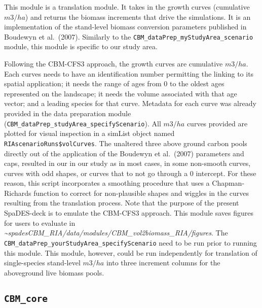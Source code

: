 \documentclass[
]{article}
\begin{document}
This module is a translation module. It takes in the growth curves
(cumulative \(m3/ha\)) and returns the biomass increments that drive the
simulations. It is an implementation of the stand-level biomass
conversion parameters published in Boudewyn et al.~(2007). Similarly to
the \texttt{CBM\_dataPrep\_myStudyArea\_scenario} module, this module is
specific to our study area.

Following the CBM-CFS3 approach, the growth curves are cumulative
\(m3/ha\). Each curves needs to have an identification number permitting
the linking to its spatial application; it needs the range of ages from
0 to the oldest ages represented on the landscape; it needs the volume
associated with that age vector; and a leading species for that curve.
Metadata for each curve was already provided in the data preparation
module (\texttt{CBM\_dataPrep\_studyArea\_specifyScenario}). All
\(m3/ha\) curves provided are plotted for visual inspection in a simList
object named \texttt{RIAscenarioRuns\$volCurves}. The unaltered three
above ground carbon pools directly out of the application of the
Boudewyn et al.~(2007) parameters and caps, resulted in our in our study
as in most cases, in some non-smooth curves, curves with odd shapes, or
curves that to not go through a 0 intercept. For these reason, this
script incorporates a smoothing procedure that uses a Chapman-Richards
function to correct for non-plausible shapes and wiggles in the curves
resulting from the translation process. Note that the purpose of the
present SpaDES-deck is to emulate the CBM-CFS3 approach. This module
saves figures for users to evaluate in
\emph{\textasciitilde spadesCBM\_RIA/data/modules/CBM\_vol2biomass\_RIA/figures}.
The \texttt{CBM\_dataPrep\_yourStudyArea\_specifyScenario} need to be
run prior to running this module. This module, however, could be run
independently for translation of single-species stand-level \(m3/ha\)
into three increment columns for the aboveground live biomass pools.

\hypertarget{cbm_core}{%
\subsection{\texorpdfstring{\texttt{CBM\_core}}{CBM\_core}}\label{cbm_core}}
\end{document}
